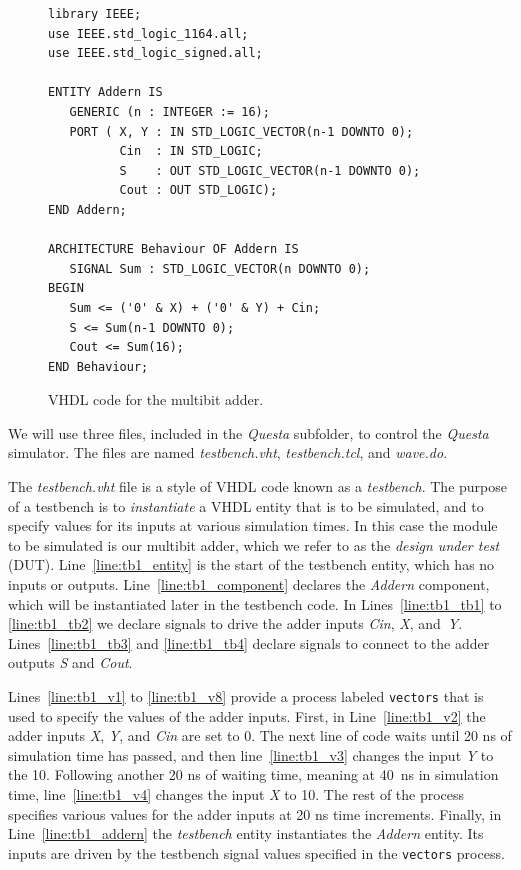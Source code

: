 \documentclass[11pt, twoside, pdftex]{article}
\begin{document}
\lstset{language=VHDL,numbers=none,escapechar=|}
\begin{figure}[h]
\begin{center}
\begin{minipage}[t]{12.5 cm}
\begin{lstlisting}[name=addern]
library IEEE;
use IEEE.std_logic_1164.all;
use IEEE.std_logic_signed.all;

ENTITY Addern IS 
   GENERIC (n : INTEGER := 16);
   PORT ( X, Y : IN STD_LOGIC_VECTOR(n-1 DOWNTO 0);
          Cin  : IN STD_LOGIC;
          S    : OUT STD_LOGIC_VECTOR(n-1 DOWNTO 0);
          Cout : OUT STD_LOGIC);
END Addern;

ARCHITECTURE Behaviour OF Addern IS 
   SIGNAL Sum : STD_LOGIC_VECTOR(n DOWNTO 0);
BEGIN 
   Sum <= ('0' & X) + ('0' & Y) + Cin;
   S <= Sum(n-1 DOWNTO 0);
   Cout <= Sum(16);
END Behaviour;
\end{lstlisting}
\end{minipage}
\caption{VHDL code for the multibit adder.}
\label{fig:addern}
\end{center}
\end{figure}

\noindent
We will use three files, included in the {\it Questa} subfolder, to control the 
{\it Questa} simulator. The files are named {\it testbench.vht}, {\it testbench.tcl}, and 
{\it wave.do}.

\noindent
The {\it testbench.vht} file is a style of VHDL code known as a {\it testbench}. 
The purpose of a testbench is to {\it instantiate} a VHDL entity that is to be simulated,
and to specify values for its inputs at various simulation times. In this case the module
to be simulated is our multibit adder, which we refer to as the {\it design under test} (DUT).
Line~\ref{line:tb1_entity} is the start of the testbench entity, which has no inputs or
outputs. Line~\ref{line:tb1_component} declares the {\it Addern} component, which will be 
instantiated later in the testbench code. In Lines~\ref{line:tb1_tb1} to \ref{line:tb1_tb2} we 
declare signals to drive the adder inputs {\it Cin}, {\it X}, and~{\it Y}.
Lines~\ref{line:tb1_tb3} and \ref{line:tb1_tb4} declare signals to connect to the 
adder outputs {\it S} and {\it Cout}.

\noindent
Lines~\ref{line:tb1_v1} to \ref{line:tb1_v8} provide a process labeled \texttt{vectors} that is used
to specify the values of the adder inputs. First, in Line~\ref{line:tb1_v2} the adder inputs 
{\it X}, {\it Y}, and {\it Cin} are set to 0. The next line of code waits until 20 ns of 
simulation time has passed, and then line~\ref{line:tb1_v3} changes the input {\it Y} to the 
10.  Following another 20 ns of waiting time, meaning at 40~ns in simulation time, 
line~\ref{line:tb1_v4} changes the input {\it X} to 10. The rest of the
process specifies various values for the adder inputs at 20 ns time increments.
Finally, in Line~\ref{line:tb1_addern} the {\it testbench} entity instantiates the {\it Addern} entity. Its inputs are driven by the testbench signal values specified in the \texttt{vectors} process. 
\end{document}
